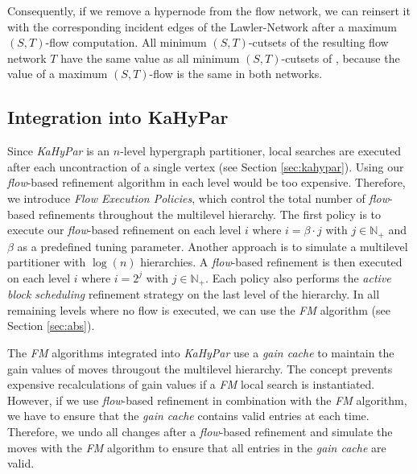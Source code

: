 Consequently, if we remove a hypernode from the flow network, we can reinsert it with the
corresponding incident edges of the Lawler-Network after a maximum $(S,T)$-flow computation.
All minimum $(S,T)$-cutsets of the resulting flow network $T$  have the same value as all minimum
$(S,T)$-cutsets of , because the value of a maximum $(S,T)$-flow is the same in both networks.


\subsection{Integration into KaHyPar}
\label{sec:integration_kahypar}  

\normalfont\normalsize
Since \emph{KaHyPar} is an $n$-level hypergraph partitioner, local searches
are executed after each uncontraction of a single vertex (see Section \ref{sec:kahypar}). 
Using our \emph{flow}-based refinement algorithm in each level would be too expensive.
Therefore, we introduce \emph{Flow Execution Policies}, which control the total number of
\emph{flow}-based refinements throughout the multilevel hierarchy. The first policy is to 
execute our \emph{flow}-based refinement on each level $i$ where $i = \beta\cdot j$ with 
$j \in \mathbb{N}_+$ and $\beta$ as a predefined tuning parameter. Another approach is to simulate a
multilevel partitioner with $\log(n)$ hierarchies. A \emph{flow}-based refinement is then
executed on each level $i$ where $i = 2^j$ with $j \in \mathbb{N}_+$. Each policy also
performs the \emph{active block scheduling} refinement strategy on the last level of the
hierarchy. In all remaining levels where no flow is executed, we can use the 
\emph{FM} algorithm 
\cite{akhremtsev2017engineering,fiduccia1988linear,sanchis1989multiple} (see Section 
\ref{sec:abs}). 

\normalfont\normalsize
The \emph{FM} algorithms integrated into \emph{KaHyPar} use a \emph{gain cache} to maintain
the gain values of moves througout the multilevel hierarchy. The concept prevents expensive recalculations
of gain values if a \emph{FM} local search is instantiated. However, if we use \emph{flow}-based
refinement in combination with the \emph{FM} algorithm, we have to ensure that the 
\emph{gain cache} contains valid entries at each time. Therefore, we undo all changes after a \emph{flow}-based
refinement and simulate the moves with the \emph{FM} algorithm to ensure that all entries in
the \emph{gain cache} are valid.

